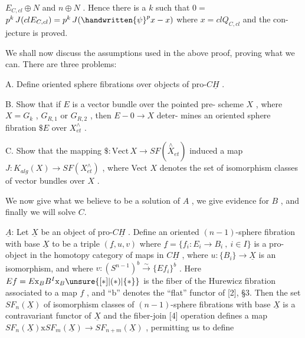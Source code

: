 
$E_{C,cl} \oplus N$ and $n \oplus N$ . Hence there is a $k$ such that $0 =$
$p^{k}\, J(clE_{C,cl}) = p^{k}\, J(\handwritten{\psi}^{p}x - x)$ where $x = clQ_{C,cl}$ and the con-%
jecture is proved.

We shall now discuss the assumptions used in the above proof,
proving what we can. There are three problems:

A. Define oriented sphere fibrations over objects of pro-$C\underline{H}$ .

B. Show that if $E$ is a vector bundle over the pointed pre-%
scheme $X$ , where $X = G_{k}$ , $G_{R,1}$ or $G_{R,2}$ , then $E - 0 \to X$ deter-%
mines an oriented sphere fibration $\$E$ over $X^{\wedge}_{et}$ .

C. Show that the mapping $\${:}\mathrm{Vect}\,X \to SF(\overset{\wedge}{X}_{et})$ induced a map
$J{:}K_{alg}(X) \to SF(X^{\wedge}_{et})$ , where Vect $X$ denotes the set of isomorphism
classes of vector bundles over $X$ .

We now give what we believe to be a solution of $A$ , we give
evidence for $B$ , and finally we will solve $C$.

$\underline{A}$: Let $\underline{X}$ be an object of pro-$C\underline{H}$ . Define an oriented
$(n - 1)$-sphere fibration with base $\underline{X}$ to be a triple $(\underline{f},u,v)$
where $\underline{f} = \{f_{i}{:}E_{i} \to B_{i}\ ,\ i \in I\}$ is a pro-object in the homotopy
category of maps in $C\underline{H}$ , where $u{:}\{B_{i}\} \to \underline{X}$ is an isomorphism,
and where $v{:}(S^{n-1})^{b} \xrightarrow{\sim} \{Ef_{i}\}^{b}$ . Here $Ef = E\mathrm{x}_{B}B^{I}\mathrm{x}_{B}\unsure{[*]|(*)|\{*\}}$ is the
fiber of the Hurewicz fibration associated to a map $f$ , and ``b''
denotes the ``flat'' functor of [2], §3. Then the set $SF_{n}(\underline{X})$ of
isomorphism classes of $(n - 1)$-sphere fibrations with base $\underline{X}$
is a contravariant functor of $\underline{X}$ and the fiber-join [4] operation
defines a map $SF_{n}(\underline{X})\mathrm{x}SF_{m}(\underline{X}) \to SF_{n+m}(\underline{X})$ , permitting us to define

